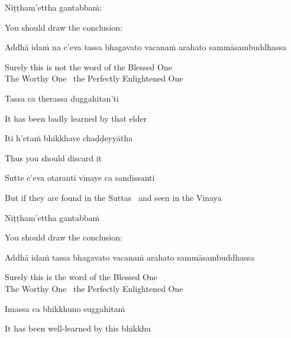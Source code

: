Niṭṭham'ettha gantabbaṁ:

\begin{english}
  You should draw the conclusion:
\end{english}

\begin{pali-hang}
  Addhā idaṁ na c'eva tassa bhagavato vacanaṁ arahato sammāsambuddhassa
\end{pali-hang}

\begin{english}
  Surely this is not the word of the Blessed One\\
  The Worthy One \breathmark\ the Perfectly Enlightened One
\end{english}

Tassa ca therassa duggahitan'ti

\begin{english}
  It has been badly learned by that elder
\end{english}

Iti h'etaṁ bhikkhave chaḍḍeyyātha

\begin{english}
  Thus you should discard it
\end{english}

\ifbfive\clearpage\fi

Sutte c'eva otaranti vinaye ca sandissanti

\begin{english-hang}
  But if they are found in the Suttas \breathmark\ and seen in the Vinaya
\end{english-hang}

\ifninebythirteen\clearpage\fi

Niṭṭham'ettha gantabbaṁ

\begin{english}
  You should draw the conclusion:
\end{english}

\begin{pali-hang}
  Addhā idaṁ tassa bhagavato vacanaṁ arahato sammāsambuddhassa
\end{pali-hang}

\begin{english}
  Surely this is the word of the Blessed One\\
  The Worthy One \breathmark\ the Perfectly Enlightened One
\end{english}

Imassa ca bhikkhuno suggahitaṁ

\begin{english}
  It has been well-learned by this bhikkhu
\end{english}

